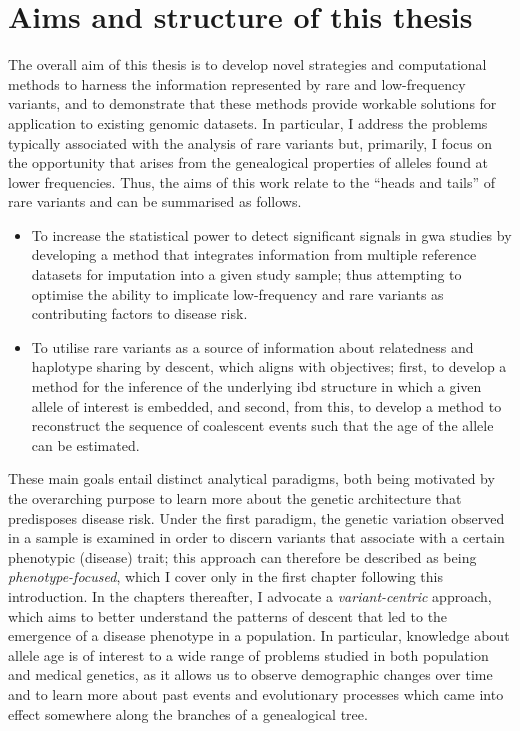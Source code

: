 %
\section{Aims and structure of this thesis}
%

The overall aim of this thesis is to develop novel strategies and computational methods to harness the information represented by rare and low-frequency variants, and to demonstrate that these methods provide workable solutions for application to existing genomic datasets.
In particular, I address the problems typically associated with the analysis of rare variants but, primarily, I focus on the opportunity that arises from the genealogical properties of alleles found at lower frequencies.
Thus, the aims of this work relate to the ``heads and tails'' of rare variants and can be summarised as follows.

\begin{itemize}
  \item To increase the statistical power to detect significant signals in \gls{gwa} studies by developing a method that integrates information from multiple reference datasets for imputation into a given study sample; thus attempting to optimise the ability to implicate low-frequency and rare variants as contributing factors to disease risk.
  \item To utilise rare variants as a source of information about relatedness and haplotype sharing by descent, which aligns with  objectives; first, to develop a method for the inference of the underlying \gls{ibd} structure in which a given allele of interest is embedded, and second, from this, to develop a method to reconstruct the sequence of coalescent events such that the age of the allele can be estimated.
\end{itemize}

These  main goals entail distinct analytical paradigms, both being motivated by the overarching purpose to learn more about the genetic architecture that predisposes disease risk.
Under the first paradigm, the genetic variation observed in a sample is examined in order to discern variants that associate with a certain phenotypic (disease) trait; this approach can therefore be described as being \emph{phenotype-focused}, which I cover only in the first chapter following this introduction.
In the chapters thereafter, I advocate a \emph{variant-centric} approach, which aims to better understand the patterns of descent that led to the emergence of a disease phenotype in a population.
In particular, knowledge about allele age is of interest to a wide range of problems studied in both population and medical genetics, as it allows us to observe demographic changes over time and to learn more about past events and evolutionary processes which came into effect somewhere along the branches of a genealogical tree.

